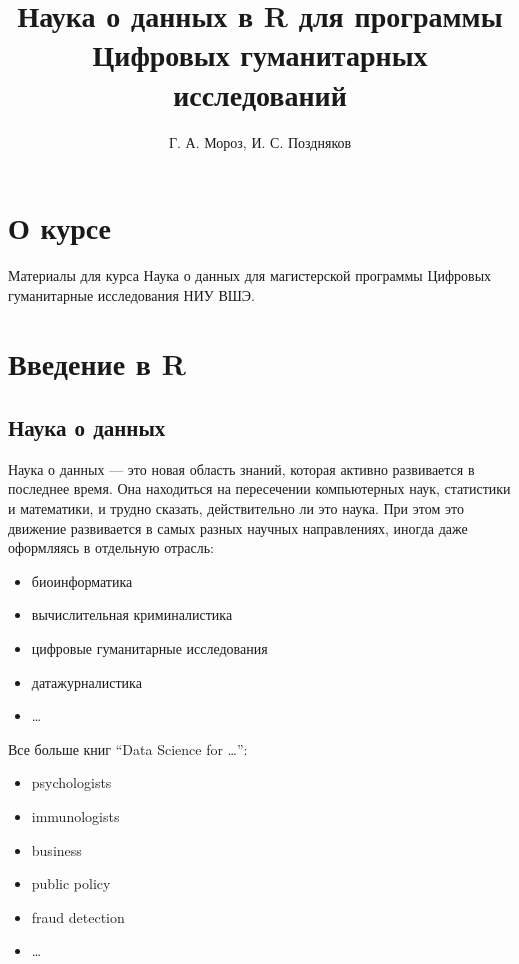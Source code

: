 \documentclass[
]{book}
\title{Наука о данных в R для программы Цифровых гуманитарных исследований}
\author{Г. А. Мороз, И. С. Поздняков}
\date{}
\providecommand{\tightlist}{%
  \setlength{\itemsep}{0pt}\setlength{\parskip}{0pt}}
\begin{document}
\maketitle

{
\setcounter{tocdepth}{1}
\tableofcontents
}
\hypertarget{ux43e-ux43aux443ux440ux441ux435}{%
\chapter{О курсе}\label{ux43e-ux43aux443ux440ux441ux435}}

Материалы для курса Наука о данных для магистерской программы Цифровых гуманитарные исследования НИУ ВШЭ.

\hypertarget{intro}{%
\chapter{Введение в R}\label{intro}}

\hypertarget{ux43dux430ux443ux43aux430-ux43e-ux434ux430ux43dux43dux44bux445}{%
\section{Наука о данных}\label{ux43dux430ux443ux43aux430-ux43e-ux434ux430ux43dux43dux44bux445}}

Наука о данных --- это новая область знаний, которая активно развивается в последнее время. Она находиться на пересечении компьютерных наук, статистики и математики, и трудно сказать, действительно ли это наука. При этом это движение развивается в самых разных научных направлениях, иногда даже оформляясь в отдельную отрасль:

\begin{itemize}
\tightlist
\item
  биоинформатика
\item
  вычислительная криминалистика
\item
  цифровые гуманитарные исследования
\item
  датажурналистика
\item
  \ldots{}
\end{itemize}

Все больше книг ``Data Science for \ldots{}'':

\begin{itemize}
\tightlist
\item
  psychologists \citep{hansjoerg19}
\item
  immunologists \citep{thomas19}
\item
  business \citep{provost13}
\item
  public policy \citep{brooks13}
\item
  fraud detection \citep{baesens15}
\item
  \ldots{}
\end{itemize}
\end{document}
